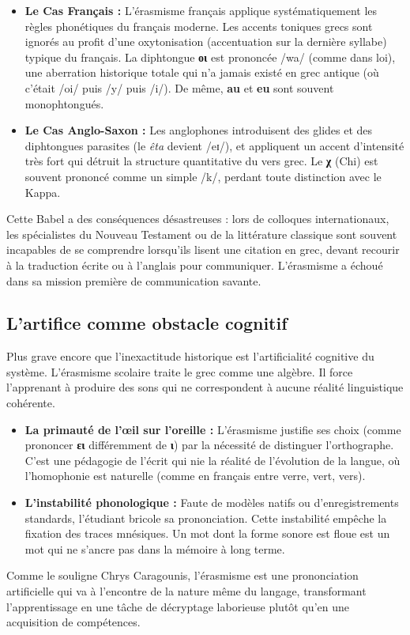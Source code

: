 \begin{itemize}\item \textbf{Le Cas Français :} L'érasmisme français applique systématiquement les règles phonétiques du français moderne. Les accents toniques grecs sont ignorés au profit d'une oxytonisation (accentuation sur la dernière syllabe) typique du français. La diphtongue \textbf{οι} est prononcée /wa/ (comme dans \og loi\fg{}), une aberration historique totale qui n'a jamais existé en grec antique (où c'était /oi/ puis /y/ puis /i/). De même, \textbf{au} et \textbf{eu} sont souvent monophtongués.\cite{ref16}\item \textbf{Le Cas Anglo-Saxon :} Les anglophones introduisent des glides et des diphtongues parasites (le \textit{êta} devient /eɪ/), et appliquent un accent d'intensité très fort qui détruit la structure quantitative du vers grec. Le \textbf{χ} (Chi) est souvent prononcé comme un simple /k/, perdant toute distinction avec le Kappa.\cite{ref13}\end{itemize}Cette \og Babel\fg{} a des conséquences désastreuses : lors de colloques internationaux, les
spécialistes du Nouveau Testament ou de la littérature classique sont souvent incapables de se
comprendre lorsqu'ils lisent une citation en grec, devant recourir à la traduction écrite ou à
l'anglais pour communiquer.\cite{ref13} L'érasmisme a échoué dans sa mission première de
communication savante.



\subsection{L'artifice comme obstacle cognitif}

Plus grave encore que l'inexactitude historique est l'artificialité cognitive du système.
L'érasmisme scolaire traite le grec comme une algèbre. Il force l'apprenant à produire des sons qui
ne correspondent à aucune réalité linguistique cohérente.

\begin{itemize}\item \textbf{La primauté de l'œil sur l'oreille :} L'érasmisme justifie ses choix (comme prononcer \textbf{ει} différemment de \textbf{ι}) par la nécessité de distinguer l'orthographe. C'est une pédagogie de l'écrit qui nie la réalité de l'évolution de la langue, où l'homophonie est naturelle (comme en français entre \og verre\fg{}, \og vert\fg{}, \og vers\fg{}).\item \textbf{L'instabilité phonologique :} Faute de modèles natifs ou d'enregistrements standards, l'étudiant \og bricole\fg{} sa prononciation. Cette instabilité empêche la fixation des traces mnésiques. Un mot dont la forme sonore est floue est un mot qui ne s'ancre pas dans la mémoire à long terme.\end{itemize}Comme le souligne Chrys Caragounis, l'érasmisme est une \og prononciation artificielle\fg{} qui va à
l'encontre de la nature même du langage, transformant l'apprentissage en une tâche de décryptage
laborieuse plutôt qu'en une acquisition de compétences.\cite{ref4}



